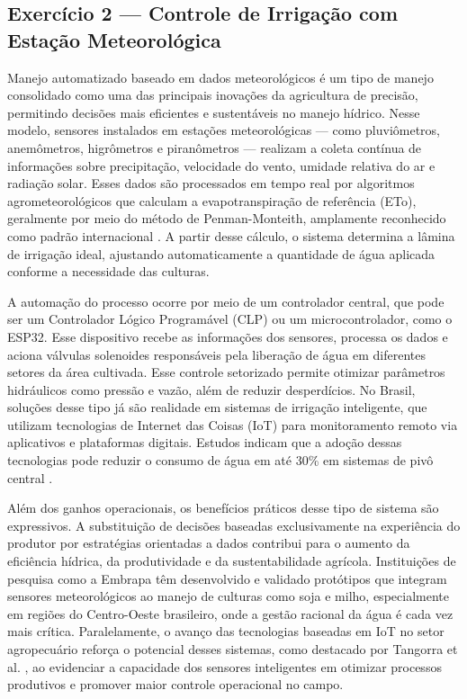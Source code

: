 \documentclass[12pt]{article}
\begin{document}
\subsection*{Exercício 2 — Controle de Irrigação com Estação Meteorológica}
Manejo automatizado baseado em dados meteorológicos é um tipo de manejo consolidado como uma das principais inovações da agricultura de precisão, permitindo decisões mais eficientes e sustentáveis no manejo hídrico. Nesse modelo, sensores instalados em estações meteorológicas — como pluviômetros, anemômetros, higrômetros e piranômetros — realizam a coleta contínua de informações sobre precipitação, velocidade do vento, umidade relativa do ar e radiação solar. Esses dados são processados em tempo real por algoritmos agrometeorológicos que calculam a evapotranspiração de referência (ETo), geralmente por meio do método de Penman-Monteith, amplamente reconhecido como padrão internacional \cite{allen1998}. A partir desse cálculo, o sistema determina a lâmina de irrigação ideal, ajustando automaticamente a quantidade de água aplicada conforme a necessidade das culturas.

A automação do processo ocorre por meio de um controlador central, que pode ser um Controlador Lógico Programável (CLP) ou um microcontrolador, como o ESP32. Esse dispositivo recebe as informações dos sensores, processa os dados e aciona válvulas solenoides responsáveis pela liberação de água em diferentes setores da área cultivada. Esse controle setorizado permite otimizar parâmetros hidráulicos como pressão e vazão, além de reduzir desperdícios. No Brasil, soluções desse tipo já são realidade em sistemas de irrigação inteligente, que utilizam tecnologias de Internet das Coisas (IoT) para monitoramento remoto via aplicativos e plataformas digitais. Estudos indicam que a adoção dessas tecnologias pode reduzir o consumo de água em até 30\% em sistemas de pivô central \cite{bassoi2024}.

Além dos ganhos operacionais, os benefícios práticos desse tipo de sistema são expressivos. A substituição de decisões baseadas exclusivamente na experiência do produtor por estratégias orientadas a dados contribui para o aumento da eficiência hídrica, da produtividade e da sustentabilidade agrícola. Instituições de pesquisa como a Embrapa têm desenvolvido e validado protótipos que integram sensores meteorológicos ao manejo de culturas como soja e milho, especialmente em regiões do Centro-Oeste brasileiro, onde a gestão racional da água é cada vez mais crítica. Paralelamente, o avanço das tecnologias baseadas em IoT no setor agropecuário reforça o potencial desses sistemas, como destacado por Tangorra et al. \cite{tangorra2024}, ao evidenciar a capacidade dos sensores inteligentes em otimizar processos produtivos e promover maior controle operacional no campo.
\end{document}
